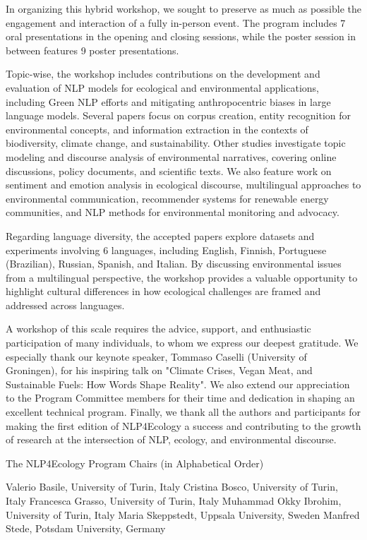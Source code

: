In organizing this hybrid workshop, we sought to preserve as much as possible the engagement and interaction of a fully in-person event. The program includes 7 oral presentations in the opening and closing sessions, while the poster session in between features 9 poster presentations.

Topic-wise, the workshop includes contributions on the development and evaluation of NLP models for ecological and environmental applications, including Green NLP efforts and mitigating anthropocentric biases in large language models. Several papers focus on corpus creation, entity recognition for environmental concepts, and information extraction in the contexts of biodiversity, climate change, and sustainability. Other studies investigate topic modeling and discourse analysis of environmental narratives, covering online discussions, policy documents, and scientific texts. We also feature work on sentiment and emotion analysis in ecological discourse, multilingual approaches to environmental communication, recommender systems for renewable energy communities, and NLP methods for environmental monitoring and advocacy.

Regarding language diversity, the accepted papers explore datasets and experiments involving 6 languages, including English, Finnish, Portuguese (Brazilian), Russian, Spanish, and Italian. By discussing environmental issues from a multilingual perspective, the workshop provides a valuable opportunity to highlight cultural differences in how ecological challenges are framed and addressed across languages.

A workshop of this scale requires the advice, support, and enthusiastic participation of many individuals, to whom we express our deepest gratitude. We especially thank our keynote speaker, Tommaso Caselli (University of Groningen), for his inspiring talk on "Climate Crises, Vegan Meat, and Sustainable Fuels: How Words Shape Reality". We also extend our appreciation to the Program Committee members for their time and dedication in shaping an excellent technical program. Finally, we thank all the authors and participants for making the first edition of NLP4Ecology a success and contributing to the growth of research at the intersection of NLP, ecology, and environmental discourse.

The NLP4Ecology Program Chairs
(in Alphabetical Order)

Valerio Basile, University of Turin, Italy 
Cristina Bosco, University of Turin, Italy 
Francesca Grasso, University of Turin, Italy
Muhammad Okky Ibrohim, University of Turin, Italy
Maria Skeppstedt, Uppsala University, Sweden
Manfred Stede, Potsdam University, Germany
